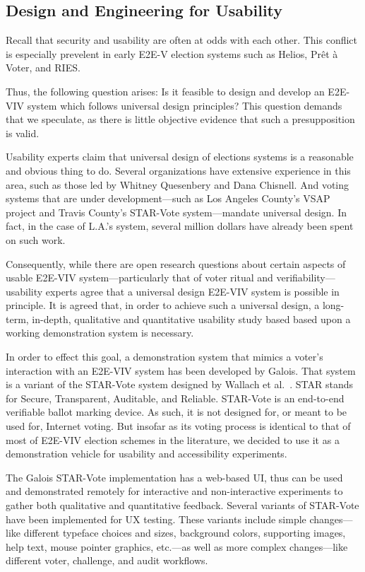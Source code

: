 \subsection{Design and Engineering for Usability}

Recall that security and usability are often at odds with each other.
This conflict is especially prevelent in early E2E-V election systems
such as Helios, Prêt à Voter, and RIES.

Thus, the following question arises: Is it feasible to design and
develop an E2E-VIV system which follows universal design principles?
This question demands that we speculate, as there is little objective
evidence that such a presupposition is valid.

Usability experts claim that universal design of elections systems is
a reasonable and obvious thing to do. Several organizations have
extensive experience in this area, such as those led by Whitney
Quesenbery and Dana Chisnell. And voting systems that are under
development---such as Los Angeles County's VSAP project and Travis
County's STAR-Vote system---mandate universal design. In fact, in the
case of L.A.'s system, several million dollars have already been spent
on such work.

Consequently, while there are open research questions about certain
aspects of usable E2E-VIV system---particularly that of voter ritual
and verifiability---usability experts agree that a universal design
E2E-VIV system is possible in principle. It is agreed that, in order
to achieve such a universal design, a long-term, in-depth, qualitative
and quantitative usability study based based upon a working
demonstration system is necessary.


In order to effect this goal, a demonstration system that mimics a
voter's interaction with an E2E-VIV system has been developed by
Galois. That system is a variant of the STAR-Vote system designed by
Wallach et al.~\cite{star-vote}. STAR stands for Secure, Transparent,
Auditable, and Reliable. STAR-Vote is an end-to-end verifiable ballot
marking device. As such, it is not designed for, or meant to be used
for, Internet voting. But insofar as its voting process is identical
to that of most of E2E-VIV election schemes in the literature, we
decided to use it as a demonstration vehicle for usability and
accessibility experiments.

The Galois STAR-Vote implementation has a web-based UI, thus can be
used and demonstrated remotely for interactive and non-interactive
experiments to gather both qualitative and quantitative feedback.
Several variants of STAR-Vote have been implemented for UX testing.
These variants include simple changes---like different typeface
choices and sizes, background colors, supporting images, help text,
mouse pointer graphics, etc.---as well as more complex changes---like
different voter, challenge, and audit workflows.

